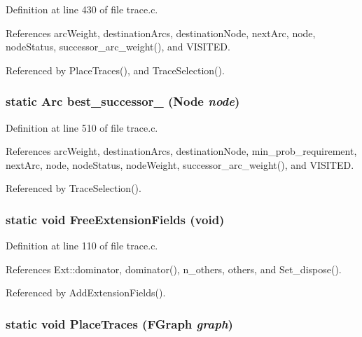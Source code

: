 Definition at line 430 of file trace.c.

References arc\-Weight, destination\-Arcs, destination\-Node, next\-Arc, node, node\-Status, successor\_\-arc\_\-weight(), and VISITED.

Referenced by Place\-Traces(), and Trace\-Selection().
\subsubsection{\setlength{\rightskip}{0pt plus 5cm}static \bf{Arc} best\_\-successor\_ (\bf{Node} {\em node})\hspace{0.3cm}{\tt  [static]}}\label{trace_8c_c3b8afe599f523fd658113ef81f447a0}




Definition at line 510 of file trace.c.

References arc\-Weight, destination\-Arcs, destination\-Node, min\_\-prob\_\-requirement, next\-Arc, node, node\-Status, node\-Weight, successor\_\-arc\_\-weight(), and VISITED.

Referenced by Trace\-Selection().
\subsubsection{\setlength{\rightskip}{0pt plus 5cm}static void Free\-Extension\-Fields (void)\hspace{0.3cm}{\tt  [static]}}\label{trace_8c_cf563a4a3ec5d6b767e758aae7fe0c4a}




Definition at line 110 of file trace.c.

References Ext::dominator, dominator(), n\_\-others, others, and Set\_\-dispose().

Referenced by Add\-Extension\-Fields().
\subsubsection{\setlength{\rightskip}{0pt plus 5cm}static void Place\-Traces (\bf{FGraph} {\em graph})\hspace{0.3cm}{\tt  [static]}}\label{trace_8c_97aad3984dbf4e78963e3c8928068366}




